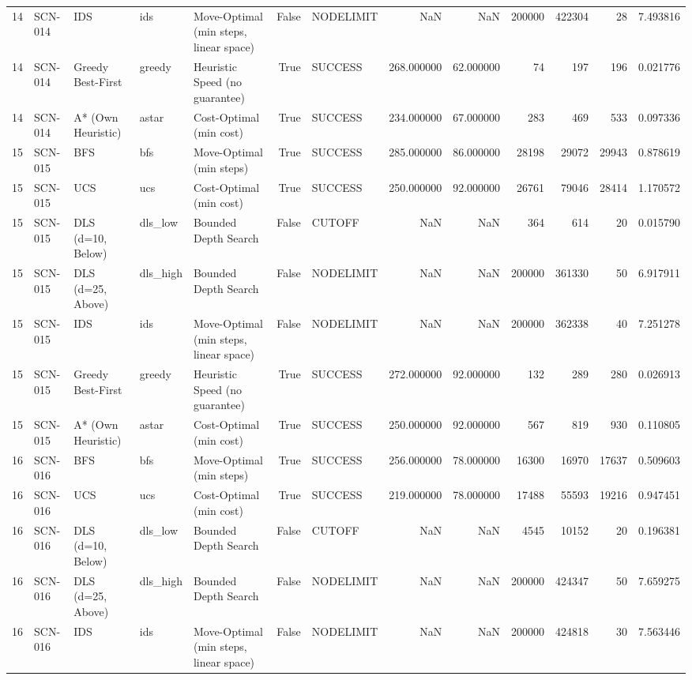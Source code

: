\begin{table}[htbp]
\begin{tabular}{rllllrlrrrrrr}
14 & SCN-014 & IDS & ids & Move-Optimal (min steps, linear space) & False & NODELIMIT & NaN & NaN & 200000 & 422304 & 28 & 7.493816 \\
14 & SCN-014 & Greedy Best-First & greedy & Heuristic Speed (no guarantee) & True & SUCCESS & 268.000000 & 62.000000 & 74 & 197 & 196 & 0.021776 \\
14 & SCN-014 & A* (Own Heuristic) & astar & Cost-Optimal (min cost) & True & SUCCESS & 234.000000 & 67.000000 & 283 & 469 & 533 & 0.097336 \\
15 & SCN-015 & BFS & bfs & Move-Optimal (min steps) & True & SUCCESS & 285.000000 & 86.000000 & 28198 & 29072 & 29943 & 0.878619 \\
15 & SCN-015 & UCS & ucs & Cost-Optimal (min cost) & True & SUCCESS & 250.000000 & 92.000000 & 26761 & 79046 & 28414 & 1.170572 \\
15 & SCN-015 & DLS (d=10, Below) & dls\_low & Bounded Depth Search & False & CUTOFF & NaN & NaN & 364 & 614 & 20 & 0.015790 \\
15 & SCN-015 & DLS (d=25, Above) & dls\_high & Bounded Depth Search & False & NODELIMIT & NaN & NaN & 200000 & 361330 & 50 & 6.917911 \\
15 & SCN-015 & IDS & ids & Move-Optimal (min steps, linear space) & False & NODELIMIT & NaN & NaN & 200000 & 362338 & 40 & 7.251278 \\
15 & SCN-015 & Greedy Best-First & greedy & Heuristic Speed (no guarantee) & True & SUCCESS & 272.000000 & 92.000000 & 132 & 289 & 280 & 0.026913 \\
15 & SCN-015 & A* (Own Heuristic) & astar & Cost-Optimal (min cost) & True & SUCCESS & 250.000000 & 92.000000 & 567 & 819 & 930 & 0.110805 \\
16 & SCN-016 & BFS & bfs & Move-Optimal (min steps) & True & SUCCESS & 256.000000 & 78.000000 & 16300 & 16970 & 17637 & 0.509603 \\
16 & SCN-016 & UCS & ucs & Cost-Optimal (min cost) & True & SUCCESS & 219.000000 & 78.000000 & 17488 & 55593 & 19216 & 0.947451 \\
16 & SCN-016 & DLS (d=10, Below) & dls\_low & Bounded Depth Search & False & CUTOFF & NaN & NaN & 4545 & 10152 & 20 & 0.196381 \\
16 & SCN-016 & DLS (d=25, Above) & dls\_high & Bounded Depth Search & False & NODELIMIT & NaN & NaN & 200000 & 424347 & 50 & 7.659275 \\
16 & SCN-016 & IDS & ids & Move-Optimal (min steps, linear space) & False & NODELIMIT & NaN & NaN & 200000 & 424818 & 30 & 7.563446 \\

\end{tabular}
\end{table}
